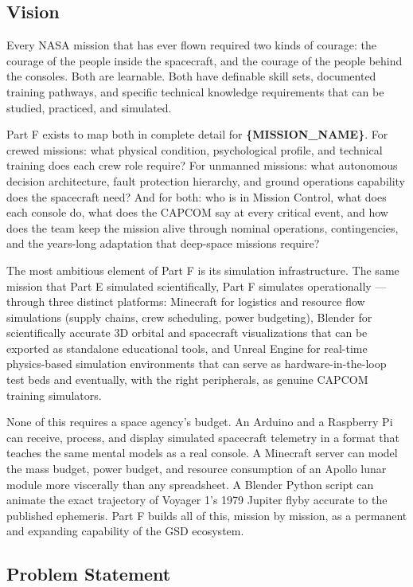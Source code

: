 \documentclass[11pt,letterpaper]{article}
\newcommand{\param}[1]{\textcolor{paramred}{\textbf{\{#1\}}}}
\begin{document}
\subsection{Vision}

Every NASA mission that has ever flown required two kinds of courage: the courage of the people inside the spacecraft, and the courage of the people behind the consoles. Both are learnable. Both have definable skill sets, documented training pathways, and specific technical knowledge requirements that can be studied, practiced, and simulated.

Part F exists to map both in complete detail for \param{MISSION\_NAME}. For crewed missions: what physical condition, psychological profile, and technical training does each crew role require? For unmanned missions: what autonomous decision architecture, fault protection hierarchy, and ground operations capability does the spacecraft need? And for both: who is in Mission Control, what does each console do, what does the CAPCOM say at every critical event, and how does the team keep the mission alive through nominal operations, contingencies, and the years-long adaptation that deep-space missions require?

The most ambitious element of Part F is its simulation infrastructure. The same mission that Part E simulated scientifically, Part F simulates operationally --- through three distinct platforms: Minecraft for logistics and resource flow simulations (supply chains, crew scheduling, power budgeting), Blender for scientifically accurate 3D orbital and spacecraft visualizations that can be exported as standalone educational tools, and Unreal Engine for real-time physics-based simulation environments that can serve as hardware-in-the-loop test beds and eventually, with the right peripherals, as genuine CAPCOM training simulators.

None of this requires a space agency's budget. An Arduino and a Raspberry Pi can receive, process, and display simulated spacecraft telemetry in a format that teaches the same mental models as a real console. A Minecraft server can model the mass budget, power budget, and resource consumption of an Apollo lunar module more viscerally than any spreadsheet. A Blender Python script can animate the exact trajectory of Voyager 1's 1979 Jupiter flyby accurate to the published ephemeris. Part F builds all of this, mission by mission, as a permanent and expanding capability of the GSD ecosystem.

\subsection{Problem Statement}
\end{document}
